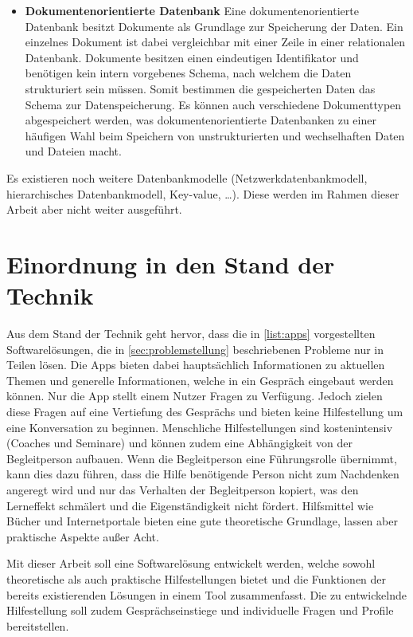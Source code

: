 \begin{itemize}
      \item \textbf{Dokumentenorientierte Datenbank} \newline
            Eine dokumentenorientierte Datenbank besitzt Dokumente als Grundlage zur Speicherung der Daten. Ein einzelnes Dokument ist dabei vergleichbar mit einer Zeile in einer relationalen Datenbank. Dokumente besitzen einen eindeutigen Identifikator und benötigen kein intern vorgebenes Schema, nach welchem die Daten strukturiert sein müssen. Somit bestimmen die gespeicherten Daten das Schema zur Datenspeicherung. Es können auch verschiedene Dokumenttypen abgespeichert werden, was dokumentenorientierte Datenbanken zu einer häufigen Wahl beim Speichern von unstrukturierten und wechselhaften Daten und Dateien macht.
\end{itemize}

Es existieren noch weitere Datenbankmodelle (Netzwerkdatenbankmodell, hierarchisches Datenbankmodell, Key-value, \dots). Diese werden im Rahmen dieser Arbeit aber nicht weiter ausgeführt.


\section{Einordnung in den Stand der Technik}
\label{sec:einordnung_sdt}

Aus dem Stand der Technik geht hervor, dass die in \ref{list:apps} vorgestellten Softwarelösungen, die in \ref{sec:problemstellung} beschriebenen Probleme nur in Teilen lösen. Die Apps bieten dabei hauptsächlich Informationen zu aktuellen Themen und generelle Informationen, welche in ein Gespräch eingebaut werden können. Nur die App  \cite{App:beyond} stellt einem Nutzer Fragen zu Verfügung. Jedoch zielen diese Fragen auf eine Vertiefung des Gesprächs und bieten keine Hilfestellung um eine Konversation zu beginnen.\newline
Menschliche Hilfestellungen sind kostenintensiv (Coaches und Seminare) und können zudem eine Abhängigkeit von der Begleitperson aufbauen. Wenn die Begleitperson eine Führungsrolle übernimmt, kann dies dazu führen, dass die Hilfe benötigende Person nicht zum Nachdenken angeregt wird und nur das Verhalten der Begleitperson kopiert, was den Lerneffekt schmälert und die Eigenständigkeit nicht fördert. \newline
Hilfsmittel wie Bücher und Internetportale bieten eine gute theoretische Grundlage, lassen aber praktische Aspekte außer Acht.

Mit dieser Arbeit soll eine Softwarelösung entwickelt werden, welche sowohl theoretische als auch praktische Hilfestellungen bietet und die Funktionen der bereits existierenden Lösungen in einem Tool zusammenfasst. Die zu entwickelnde Hilfestellung soll zudem Gesprächseinstiege und individuelle Fragen und Profile bereitstellen.
